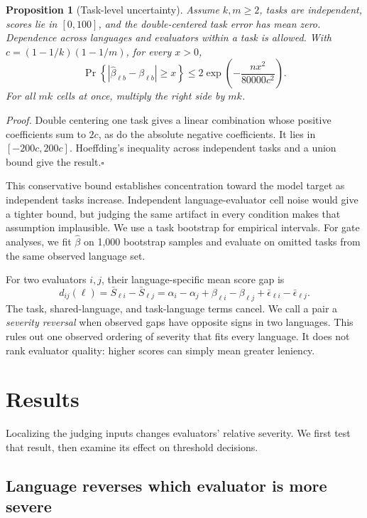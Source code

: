 \documentclass[sigconf,anonymous]{aamas}
\newtheorem{proposition}{Proposition}
\begin{document}
\begin{proposition}[Task-level uncertainty]
\label{prop:bound}
Assume $k,m\geq2$, tasks are independent, scores lie in $[0,100]$, and the
double-centered task error has mean zero. Dependence across languages
and evaluators within a task is allowed. With
$c=(1-1/k)(1-1/m)$, for every $x>0$,
\[
\Pr\!\left\{|\hat\beta_{\ell b}-\beta_{\ell b}|\geq x\right\}
\leq 2\exp\!\left(-\frac{n x^2}{80000c^2}\right).
\]
For all $mk$ cells at once, multiply the right side by $mk$.
\end{proposition}
\noindent\emph{Proof.} Double centering one task gives a linear
combination whose positive coefficients sum to $2c$, as do the
absolute negative coefficients. It lies in $[-200c,200c]$.
Hoeffding's inequality across independent tasks and a union bound
give the result.\hfill$\square$

This conservative bound establishes concentration toward the model target
as independent tasks increase. Independent language-evaluator cell noise
would give a tighter bound, but judging the same artifact in every
condition makes that assumption implausible. We use a task bootstrap for
empirical intervals.
For gate analyses, we fit $\hat\beta$ on 1{,}000 bootstrap samples and
evaluate on omitted tasks from the same observed language set.

For two evaluators $i,j$, their language-specific mean score gap is
\begin{equation}
d_{ij}(\ell)=\bar S_{\ell i}-\bar S_{\ell j}
=\alpha_i-\alpha_j+\beta_{\ell i}-\beta_{\ell j}
  +\bar\epsilon_{\ell i}-\bar\epsilon_{\ell j}.
\label{eq:gap}
\end{equation}
The task, shared-language, and task-language terms cancel. We call a
pair a \emph{severity reversal} when observed gaps have opposite signs
in two languages. This rules out one observed ordering of severity
that fits every language. It does not rank evaluator quality: higher
scores can simply mean greater leniency.

\section{Results}
\label{sec:results}

Localizing the judging inputs changes evaluators' relative severity. We first test
that result, then examine its effect on threshold decisions.

\subsection{Language reverses which evaluator is more severe}
\end{document}
